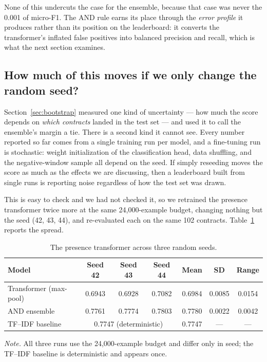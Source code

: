 None of this undercuts the case for the ensemble, because that case was never the 0.001 of micro-F1. The AND rule earns its place through the \emph{error profile} it produces rather than its position on the leaderboard: it converts the transformer's inflated false positives into balanced precision and recall, which is what the next section examines.

\subsection{How much of this moves if we only change the random seed?}
\label{sec:seeds}
Section~\ref{sec:bootstrap} measured one kind of uncertainty --- how much the score depends on \emph{which contracts} landed in the test set --- and used it to call the ensemble's margin a tie. There is a second kind it cannot see. Every number reported so far comes from a single training run per model, and a fine-tuning run is stochastic: weight initialization of the classification head, data shuffling, and the negative-window sample all depend on the seed. If simply reseeding moves the score as much as the effects we are discussing, then a leaderboard built from single runs is reporting noise regardless of how the test set was drawn.

This is easy to check and we had not checked it, so we retrained the presence transformer twice more at the same 24{,}000-example budget, changing nothing but the seed (42, 43, 44), and re-evaluated each on the same 102 contracts. Table~\ref{tab:seeds} reports the spread.

\begin{table}[ht]
\centering
\caption{The presence transformer across three random seeds.}
\label{tab:seeds}
\small
\begin{tabular}{lcccccc}
\toprule
\textbf{Model} & \textbf{Seed 42} & \textbf{Seed 43} & \textbf{Seed 44} & \textbf{Mean} & \textbf{SD} & \textbf{Range}\\
\midrule
Transformer (max-pool) & 0.6943 & 0.6928 & 0.7082 & 0.6984 & 0.0085 & 0.0154\\
AND ensemble           & 0.7761 & 0.7774 & 0.7803 & 0.7780 & 0.0022 & 0.0042\\
\midrule
TF--IDF baseline       & \multicolumn{3}{c}{0.7747 (deterministic)} & 0.7747 & --- & ---\\
\bottomrule
\end{tabular}

{\footnotesize\singlespacing \emph{Note.} All three runs use the 24{,}000-example budget and differ only in seed; the TF--IDF baseline is deterministic and appears once.\par}
\end{table}

